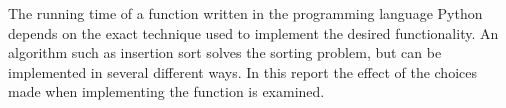 The running time of a function written in the programming language Python depends on the exact technique used to implement the desired functionality. An algorithm such as insertion sort solves the sorting problem, but can be implemented in several different ways. In this report the effect of the choices made when implementing the function is examined.